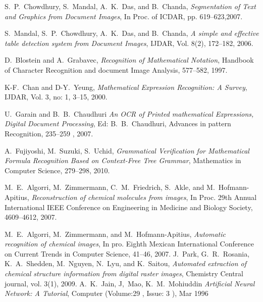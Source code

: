 \begin{thebibliography}{1}


 S.~P.~Chowdhury, S.~Mandal, A.~K.~Das, and
B.~Chanda, \emph{Segmentation of Text and Graphics from Document
Images}, In Proc. of ICDAR, pp. 619–623,2007.

 S.~Mandal, S.~P.~Chowdhury, A.~K.~Das, and
B.~Chanda, \emph{A simple and effective table detection system
from Document Images}, IJDAR, Vol. 8(2), 172–182, 2006.

 D.~Blostein and A.~Grabavec,
\emph{Recognition of Mathematical Notation}, Handbook of
Character Recognition and document Image Analysis, 577--582,
1997.
 
 K-F.~Chan and D-Y.~Yeung, \emph{Mathematical
Expression Recognition: A Survey}, IJDAR, Vol. 3, no: 1, 3–15,
2000.

 U.~Garain and B.~B.~Chaudhuri \emph{An OCR
of Printed mathematical Expressions, Digital Document
Processing}, Ed: B.~B.~Chaudhuri, Advances in pattern
Recognition, 235–259 , 2007.

A.~Fujiyoshi, M.~Suzuki, S.~Uchid,
 \emph{Grammatical Verification for Mathematical Formula Recognition Based on Context-Free Tree Grammar},
 Mathematics in Computer Science, 279--298, 2010.
 
 
 M.~E.~Algorri, M.~Zimmermann, C.~M.~Friedrich, S.~Akle, and M.~Hofmann-Apitius,
\emph{Reconstruction of chemical molecules from images},
In Proc. 29th Annual International IEEE Conference on Engineering in
Medicine and Biology Society, 4609--4612, 2007.

M.~E.~Algorri, M.~Zimmermann, and M.~Hofmann-Apitius,
\emph{Automatic recognition of chemical images},
In pro. Eighth Mexican International Conference on Current Trends in Computer Science, 41--46, 2007.
J.~Park, G.~R.~Rosania, K.~A.~Shedden, M.~Nguyen, N.~Lyu, and K.~Saitou,
\emph{Automated extraction of chemical structure information from digital raster images}, Chemistry Central journal, vol. 3(1), 2009.
A.~K.~Jain, J,~Mao, K.~M.~Mohiuddin
\emph{Artificial Neural Network: A Tutorial}, Computer  (Volume:29 ,  Issue: 3 ), Mar 1996

\end{thebibliography}



